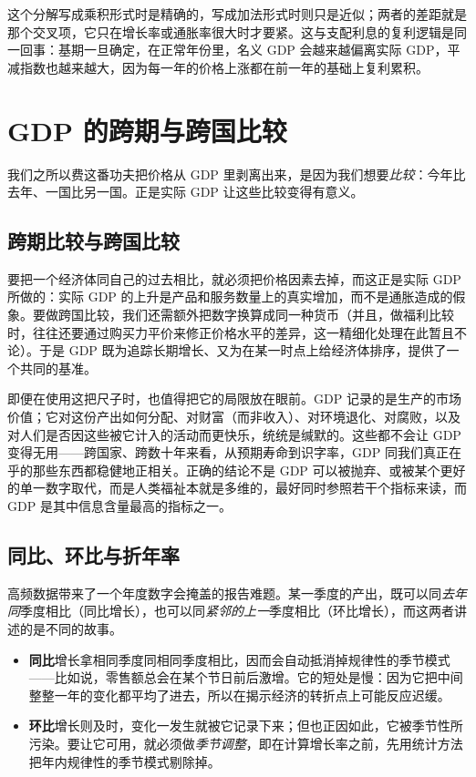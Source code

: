 这个分解写成乘积形式时是精确的，写成加法形式时则只是近似；两者的差距就是那个交叉项，它只在增长率或通胀率很大时才要紧。这与支配利息的复利逻辑是同一回事：基期一旦确定，在正常年份里，名义 GDP 会越来越偏离实际 GDP，平减指数也越来越大，因为每一年的价格上涨都在前一年的基础上复利累积。

\section{GDP 的跨期与跨国比较}

我们之所以费这番功夫把价格从 GDP 里剥离出来，是因为我们想要\emph{比较}：今年比去年、一国比另一国。正是实际 GDP 让这些比较变得有意义。

\subsection{跨期比较与跨国比较}

要把一个经济体同自己的过去相比，就必须把价格因素去掉，而这正是实际 GDP 所做的：实际 GDP 的上升是产品和服务数量上的真实增加，而不是通胀造成的假象。要做跨国比较，我们还需额外把数字换算成同一种货币（并且，做福利比较时，往往还要通过购买力平价来修正价格水平的差异，这一精细化处理在此暂且不论）。于是 GDP 既为追踪长期增长、又为在某一时点上给经济体排序，提供了一个共同的基准。

即便在使用这把尺子时，也值得把它的局限放在眼前。GDP 记录的是生产的市场价值；它对这份产出如何分配、对财富（而非收入）、对环境退化、对腐败，以及对人们是否因这些被它计入的活动而更快乐，统统是缄默的。这些都不会让 GDP 变得无用——跨国家、跨数十年来看，从预期寿命到识字率，GDP 同我们真正在乎的那些东西都稳健地正相关。正确的结论不是 GDP 可以被抛弃、或被某个更好的单一数字取代，而是人类福祉本就是多维的，最好同时参照若干个指标来读，而 GDP 是其中信息含量最高的指标之一。

\subsection{同比、环比与折年率}

高频数据带来了一个年度数字会掩盖的报告难题。某一季度的产出，既可以同\emph{去年同}季度相比（同比增长），也可以同\emph{紧邻的上一}季度相比（环比增长），而这两者讲述的是不同的故事。

\begin{itemize}
    \item \textbf{同比}增长拿相同季度同相同季度相比，因而会自动抵消掉规律性的季节模式——比如说，零售额总会在某个节日前后激增。它的短处是慢：因为它把中间整整一年的变化都平均了进去，所以在揭示经济的转折点上可能反应迟缓。
    \item \textbf{环比}增长则及时，变化一发生就被它记录下来；但也正因如此，它被季节性所污染。要让它可用，就必须做\emph{季节调整}，即在计算增长率之前，先用统计方法把年内规律性的季节模式剔除掉。
\end{itemize}

